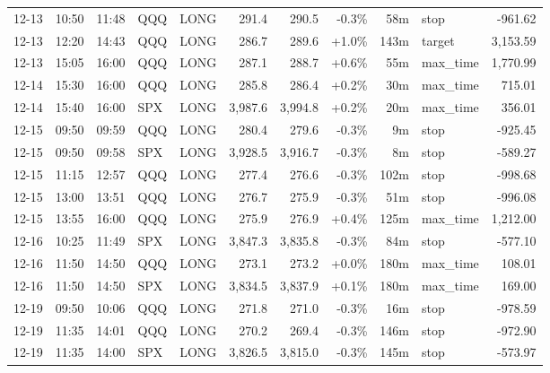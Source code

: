 \documentclass[11pt,a4paper,twoside]{article}
\begin{document}
\begin{center}
\begin{longtable}{>{\color{txtmain}}l l l l l r r r r >{\color{txtmain}}l r}
12-13 & 10:50 & 11:48 & QQQ & LONG & 291.4 & 290.5 & \textcolor{lossred}{-0.3\%} & 58m & stop & \textcolor{lossred}{-961.62} \\
12-13 & 12:20 & 14:43 & QQQ & LONG & 286.7 & 289.6 & \textcolor{wingreen}{+1.0\%} & 143m & target & \textcolor{wingreen}{3,153.59} \\
12-13 & 15:05 & 16:00 & QQQ & LONG & 287.1 & 288.7 & \textcolor{wingreen}{+0.6\%} & 55m & max\_time & \textcolor{wingreen}{1,770.99} \\
12-14 & 15:30 & 16:00 & QQQ & LONG & 285.8 & 286.4 & \textcolor{wingreen}{+0.2\%} & 30m & max\_time & \textcolor{wingreen}{715.01} \\
12-14 & 15:40 & 16:00 & SPX & LONG & 3,987.6 & 3,994.8 & \textcolor{wingreen}{+0.2\%} & 20m & max\_time & \textcolor{wingreen}{356.01} \\
12-15 & 09:50 & 09:59 & QQQ & LONG & 280.4 & 279.6 & \textcolor{lossred}{-0.3\%} & 9m & stop & \textcolor{lossred}{-925.45} \\
12-15 & 09:50 & 09:58 & SPX & LONG & 3,928.5 & 3,916.7 & \textcolor{lossred}{-0.3\%} & 8m & stop & \textcolor{lossred}{-589.27} \\
12-15 & 11:15 & 12:57 & QQQ & LONG & 277.4 & 276.6 & \textcolor{lossred}{-0.3\%} & 102m & stop & \textcolor{lossred}{-998.68} \\
12-15 & 13:00 & 13:51 & QQQ & LONG & 276.7 & 275.9 & \textcolor{lossred}{-0.3\%} & 51m & stop & \textcolor{lossred}{-996.08} \\
12-15 & 13:55 & 16:00 & QQQ & LONG & 275.9 & 276.9 & \textcolor{wingreen}{+0.4\%} & 125m & max\_time & \textcolor{wingreen}{1,212.00} \\
12-16 & 10:25 & 11:49 & SPX & LONG & 3,847.3 & 3,835.8 & \textcolor{lossred}{-0.3\%} & 84m & stop & \textcolor{lossred}{-577.10} \\
12-16 & 11:50 & 14:50 & QQQ & LONG & 273.1 & 273.2 & \textcolor{wingreen}{+0.0\%} & 180m & max\_time & \textcolor{wingreen}{108.01} \\
12-16 & 11:50 & 14:50 & SPX & LONG & 3,834.5 & 3,837.9 & \textcolor{wingreen}{+0.1\%} & 180m & max\_time & \textcolor{wingreen}{169.00} \\
12-19 & 09:50 & 10:06 & QQQ & LONG & 271.8 & 271.0 & \textcolor{lossred}{-0.3\%} & 16m & stop & \textcolor{lossred}{-978.59} \\
12-19 & 11:35 & 14:01 & QQQ & LONG & 270.2 & 269.4 & \textcolor{lossred}{-0.3\%} & 146m & stop & \textcolor{lossred}{-972.90} \\
12-19 & 11:35 & 14:00 & SPX & LONG & 3,826.5 & 3,815.0 & \textcolor{lossred}{-0.3\%} & 145m & stop & \textcolor{lossred}{-573.97} \\

\end{longtable}
\end{center}
\end{document}

